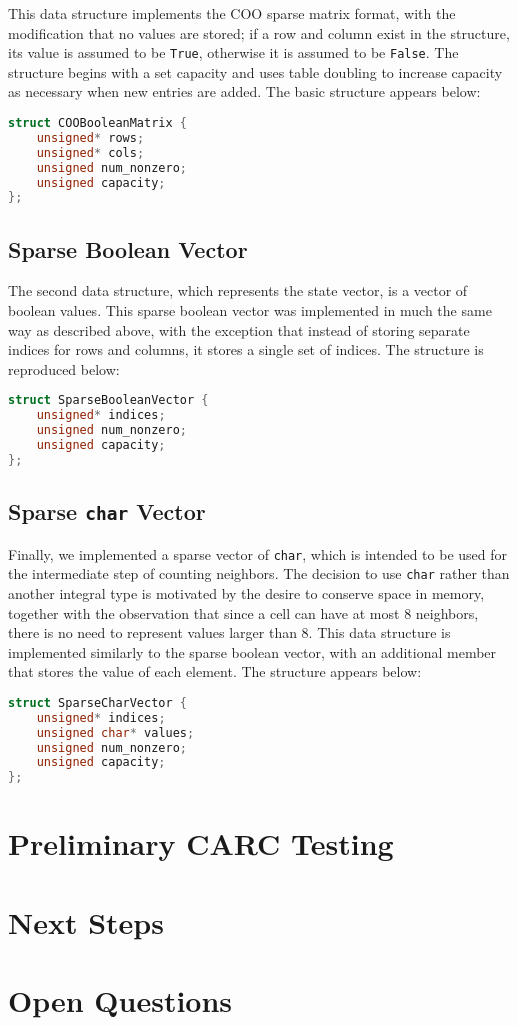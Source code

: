 \documentclass[12pt]{article}
\begin{document}
This data structure implements the COO sparse matrix format, with the modification that no values are stored; if a row and column exist in the structure, its value is assumed to be \texttt{True}, otherwise it is assumed to be \texttt{False}. The structure begins with a set capacity and uses table doubling \cite{mit} to increase capacity as necessary when new entries are added. The basic structure appears below: \\

\begin{lstlisting}[language=C]
struct COOBooleanMatrix {
    unsigned* rows;
    unsigned* cols;
    unsigned num_nonzero;
    unsigned capacity;
};
\end{lstlisting}

\subsection{Sparse Boolean Vector}

The second data structure, which represents the state vector, is a vector of boolean values. This sparse boolean vector was implemented in much the same way as described above, with the exception that instead of storing separate indices for rows and columns, it stores a single set of indices. The structure is reproduced below: \\

\begin{lstlisting}[language=C]
struct SparseBooleanVector {
    unsigned* indices;
    unsigned num_nonzero;
    unsigned capacity;
};
\end{lstlisting}

\subsection{Sparse \texttt{char} Vector}

Finally, we implemented a sparse vector of \texttt{char}, which is intended to be used for the intermediate step of counting neighbors. The decision to use \texttt{char} rather than another integral type is motivated by the desire to conserve space in memory, together with the observation that since a cell can have at most 8 neighbors, there is no need to represent values larger than 8. This data structure is implemented similarly to the sparse boolean vector, with an additional member that stores the value of each element. The structure appears below: \\

\begin{lstlisting}[language=C]
struct SparseCharVector {
    unsigned* indices;
    unsigned char* values;
    unsigned num_nonzero;
    unsigned capacity;
};
\end{lstlisting}

\section{Preliminary CARC Testing}

\section{Next Steps}

\section{Open Questions}

\printbibliography[
heading=bibintoc,
title={References}
]
\end{document}
